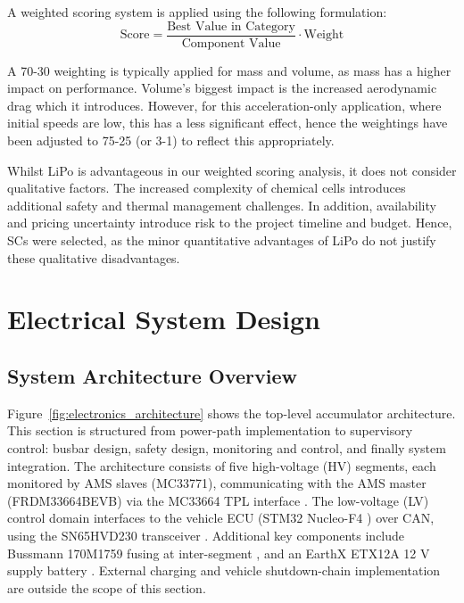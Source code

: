 \documentclass[11pt, a4paper]{report}
\numberwithin{equation}{section}
\begin{document}
A weighted scoring system is applied using the following formulation:
\begin{equation*}
\text{Score} = \frac{\text{Best Value in Category}}{\text{Component Value}} \cdot \text{Weight}
\end{equation*}

A 70-30 weighting is typically applied for mass and volume, as mass has a higher impact on performance. Volume's biggest impact is the increased aerodynamic drag which it introduces. However, for this acceleration-only application, where initial speeds are low, this has a less significant effect, hence the weightings have been adjusted to 75-25 (or 3-1) to reflect this appropriately.

Whilst LiPo is advantageous in our weighted scoring analysis, it does not consider qualitative factors. The increased complexity of chemical cells introduces additional safety and thermal management challenges. In addition, availability and pricing uncertainty introduce risk to the project timeline and budget. Hence, SCs were selected, as the minor quantitative advantages of LiPo do not justify these qualitative disadvantages.

\section{Electrical System Design}

\subsection{System Architecture Overview}

Figure~\ref{fig:electronics_architecture} shows the top-level accumulator architecture. This section is structured from power-path implementation to supervisory control: busbar design, safety design, monitoring and control, and finally system integration. The architecture consists of five high-voltage (HV) segments, each monitored by AMS slaves (MC33771), communicating with the AMS master (FRDM33664BEVB) via the MC33664 TPL interface \cite{nxp-mc33771-ds}. The low-voltage (LV) control domain interfaces to the vehicle ECU (STM32 Nucleo-F4 \cite{stm32-nucleo-f4}) over CAN, using the SN65HVD230 transceiver \cite{ti-sn65hvd230-ds}. Additional key components include Bussmann 170M1759 fusing at inter-segment \cite{eaton-bussmann-170m1759-ds}, and an EarthX ETX12A 12 V supply battery \cite{earthx-etx12a-ds}. External charging and vehicle shutdown-chain implementation are outside the scope of this section.
\end{document}
